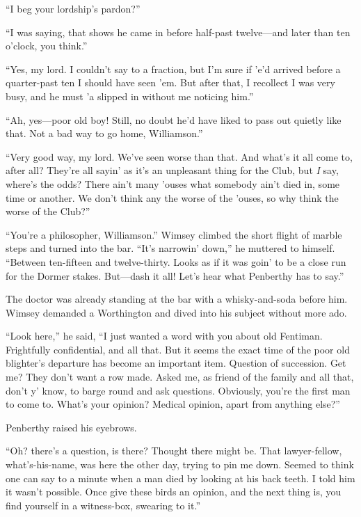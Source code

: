 \enquote{I beg your lordship's pardon?}

\enquote{I was saying, that shows he came in before half-past twelve\allowbreak---\allowbreak and later than ten o'clock, you think.}

\enquote{Yes, my lord. I couldn't say to a fraction, but I'm sure if 'e'd arrived before a quarter-past ten I should have seen 'em. But after that, I recollect I was very busy, and he must 'a slipped in without me noticing him.}

\enquote{Ah, yes\allowbreak---\allowbreak poor old boy! Still, no doubt he'd have liked to pass out quietly like that. Not a bad way to go home, Williamson.}

\enquote{Very good way, my lord. We've seen worse than that. And what's it all come to, after all? They're all sayin' as it's an unpleasant thing for the Club, but \textit{I} say, where's the odds? There ain't many 'ouses what somebody ain't died in, some time or another. We don't think any the worse of the 'ouses, so why think the worse of the Club?}

\enquote{You're a philosopher, Williamson.} Wimsey climbed the short flight of marble steps and turned into the bar. \enquote{It's narrowin' down,} he muttered to himself. \enquote{Between ten-fifteen and twelve-thirty. Looks as if it was goin' to be a close run for the Dormer stakes. But\allowbreak---\allowbreak dash it all! Let's hear what Penberthy has to say.}

The doctor was already standing at the bar with a whisky-and-soda before him. Wimsey demanded a Worthington and dived into his subject without more ado.

\enquote{Look here,} he said, \enquote{I just wanted a word with you about old Fentiman. Frightfully confidential, and all that. But it seems the exact time of the poor old blighter's departure has become an important item. Question of succession. Get me? They don't want a row made. Asked me, as friend of the family and all that, don't y' know, to barge round and ask questions. Obviously, you're the first man to come to. What's your opinion? Medical opinion, apart from anything else?}

Penberthy raised his eyebrows.

\enquote{Oh? there's a question, is there? Thought there might be. That lawyer-fellow, what's-his-name, was here the other day, trying to pin me down. Seemed to think one can say to a minute when a man died by looking at his back teeth. I told him it wasn't possible. Once give these birds an opinion, and the next thing is, you find yourself in a witness-box, swearing to it.}

